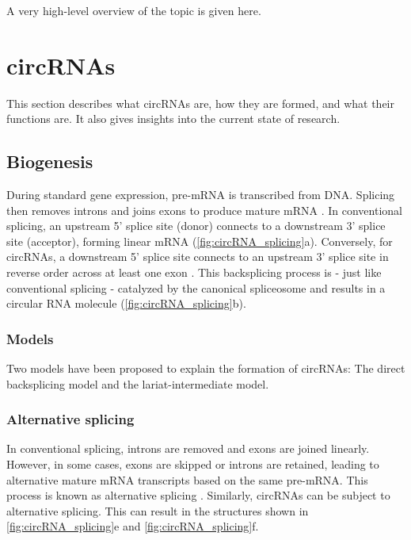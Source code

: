 A very high-level overview of the topic is given here.

\lipsum[1]

\section{circRNAs}
This section describes what circRNAs are, how they are formed, and what their functions are.
It also gives insights into the current state of research.

\subsection{Biogenesis}
During standard gene expression, pre-mRNA is transcribed from DNA.
Splicing then removes introns and joins exons to produce mature mRNA \supercite{black_mechanisms_2003}.
In conventional splicing, an upstream 5' splice site (donor) connects to a downstream 3' splice site (acceptor), forming linear mRNA (\cref{fig:circRNA_splicing}a).
Conversely, for circRNAs, a downstream 5' splice site connects to an upstream 3' splice site in reverse order across at least one exon \supercite{chen_expanding_2020}.
This backsplicing process is - just like conventional splicing - catalyzed by the canonical spliceosome \supercite{starke_exon_2015} and results in a circular RNA molecule (\cref{fig:circRNA_splicing}b).

\subsubsection{Models}
Two models have been proposed to explain the formation of circRNAs: The direct backsplicing model and the lariat-intermediate model.

\subsubsection{Alternative splicing}
In conventional splicing, introns are removed and exons are joined linearly.
However, in some cases, exons are skipped or introns are retained, leading to alternative mature mRNA transcripts based on the same pre-mRNA.
This process is known as alternative splicing \supercite{nilsen_expansion_2010}.
Similarly, circRNAs can be subject to alternative splicing. This can result in the structures shown in \cref{fig:circRNA_splicing}e and \cref{fig:circRNA_splicing}f.

